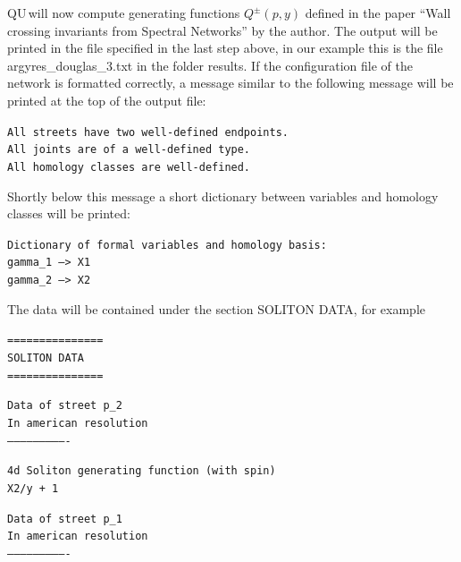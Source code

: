 \documentclass[11pt]{article}
\def\QU{{\sf QU}$\,$}
\begin{document}
\medskip

\QU will now compute generating functions $Q^{\pm}(p,y)$ defined in the paper ``Wall crossing invariants from Spectral Networks'' by the author.
The output will be printed in the file specified in the last step above, in our example this is the file {\sf  argyres\_douglas\_3.txt} in the folder {\sf results}.
If the configuration file of the network is formatted correctly, a message similar to the following message will be printed at the top of the output file:

\medskip

\noindent \texttt{All streets have two well-defined endpoints.}\\
\texttt{All joints are of a well-defined type.}\\
\texttt{All homology classes are well-defined.}\\

\medskip

Shortly below this message a short dictionary between variables and homology classes will be printed:

\medskip

\noindent \texttt{Dictionary of formal variables and homology basis:}\\
\texttt{gamma\_1 ---> X1}\\
\texttt{gamma\_2 ---> X2}

\medskip

The data will be contained under the section {\sf SOLITON DATA}, for example

\medskip


\noindent\texttt{===============}\\
\texttt{SOLITON DATA}\\
\texttt{===============}

\smallskip

\noindent\texttt{Data of street p\_2}\\
\texttt{In american resolution}\\
\texttt{----------------------------}

\smallskip

\noindent\texttt{4d Soliton generating function (with spin)}\\
\texttt{X2/y + 1}



\bigskip

\noindent\texttt{Data of street p\_1}\\
\texttt{In american resolution}\\
\texttt{----------------------------}
\end{document}
